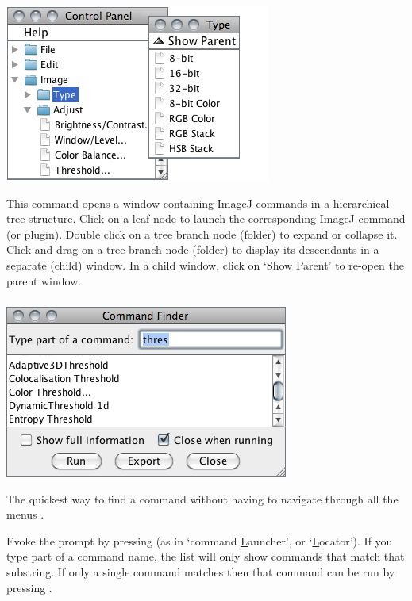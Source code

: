 \begin{minipage}[c][1\totalheight][t]{0.415\columnwidth}%
\includegraphics[scale=0.55]{images/ControlPanel}%
\end{minipage}%
\begin{minipage}[c][1\totalheight][t]{0.585\columnwidth}%
This command \cite{C-ControlPanel} opens a window containing ImageJ
commands in a hierarchical tree structure. Click on a leaf node to
launch the corresponding ImageJ command (or plugin). Double click
on a tree branch node (folder) to expand or collapse it. Click and
drag on a tree branch node (folder) to display its descendants in
a separate (child) window. In a child window, click on `Show Parent'
to re-open the parent window.%
\end{minipage}




\subsubsection{\protect{}\label{sub:Command-Finder}}

\begin{minipage}[c][1\totalheight][t]{0.485\columnwidth}%
\includegraphics[scale=0.55]{images/CommandFinder}%
\end{minipage}%
\begin{minipage}[c][1\totalheight][t]{0.515\columnwidth}%
The quickest way to find a command without having to navigate through
all the menus \cite{C-ComandFinder}.\medskip{}


Evoke the prompt by pressing  (as in `command \uline{L}auncher',
or `\uline{L}ocator'). If you type part of a command name, the
list will only show commands that match that substring. If only a
single command matches then that command can be run by pressing . %
\end{minipage} 

